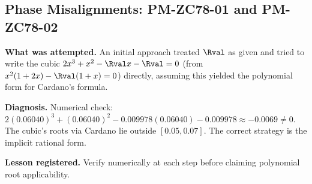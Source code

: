\documentclass[12pt, a4paper]{article}
\begin{document}
\subsection{Phase Misalignments: PM-ZC78-01 and PM-ZC78-02}
\label{sec:pm}

\begin{openqbox}[title={PM-ZC78-01: Attempted Polynomial Root Formula
  Before Deriving the Implicit Equation
  (pattern: probe malformed)}]

\textbf{What was attempted.}
An initial approach treated $\Rval$ as given and tried to write
the cubic $2x^3 + x^2 - \Rval x - \Rval = 0$ (from
$x^2(1+2x) - \Rval(1+x) = 0$) directly, assuming this yielded
the polynomial form for Cardano's formula.

\textbf{Diagnosis.}
Numerical check: $2(0.06040)^3 + (0.06040)^2 - 0.009978(0.06040)
- 0.009978 \approx -0.0069 \neq 0$.
The cubic's roots via Cardano lie outside $[0.05, 0.07]$.
The correct strategy is the implicit rational form.

\textbf{Lesson registered.}
Verify numerically at each step before claiming polynomial root
applicability.
\end{openqbox}
\end{document}
